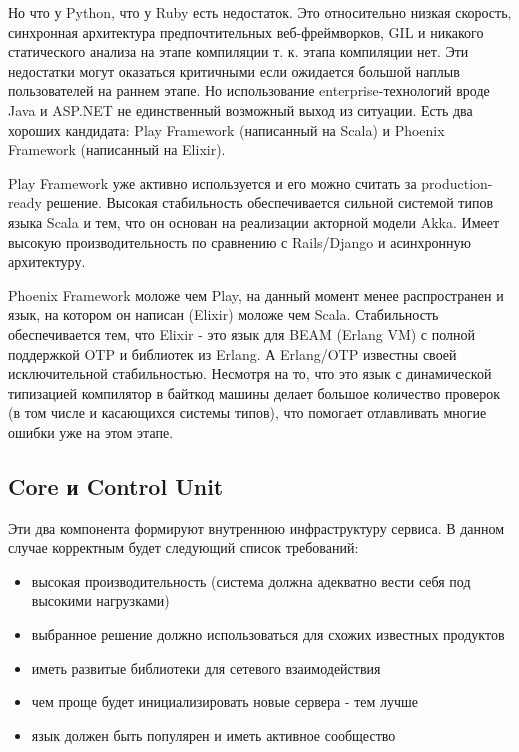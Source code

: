 Но что у Python, что у Ruby есть недостаток. Это относительно низкая скорость, синхронная архитектура предпочтительных веб-фреймворков, GIL и никакого статического анализа на этапе компиляции т. к. этапа компиляции нет. Эти недостатки могут оказаться критичными если ожидается большой наплыв пользователей на раннем этапе. Но использование enterprise-технологий вроде Java и ASP.NET не единственный возможный выход из ситуации. Есть два хороших кандидата: Play Framework (написанный на Scala) и Phoenix Framework (написанный на Elixir).

Play Framework уже активно используется и его можно считать за production-ready решение. Высокая стабильность обеспечивается сильной системой типов языка Scala и тем, что он основан на реализации акторной модели Akka. Имеет высокую производительность по сравнению с Rails/Django и асинхронную архитектуру.

Phoenix Framework моложе чем Play, на данный момент менее распространен и язык, на котором он написан (Elixir) моложе чем Scala. Стабильность обеспечивается тем, что Elixir - это язык для BEAM (Erlang VM) с полной поддержкой OTP и библиотек из Erlang. А Erlang/OTP известны своей исключительной стабильностью. Несмотря на то, что это язык с динамической типизацией компилятор в байткод машины делает большое количество проверок (в том числе и касающихся системы типов), что помогает отлавливать многие ошибки уже на этом этапе.

\subsection{Core и Control Unit}

Эти два компонента формируют внутреннюю инфраструктуру сервиса. В данном случае корректным будет следующий список требований:

\begin{itemize}
	\item высокая производительность (система должна адекватно вести себя под высокими нагрузками)
	\item выбранное решение должно использоваться для схожих известных продуктов
	\item иметь развитые библиотеки для сетевого взаимодействия
	\item чем проще будет инициализировать новые сервера - тем лучше
	\item язык должен быть популярен и иметь активное сообщество
\end{itemize}

